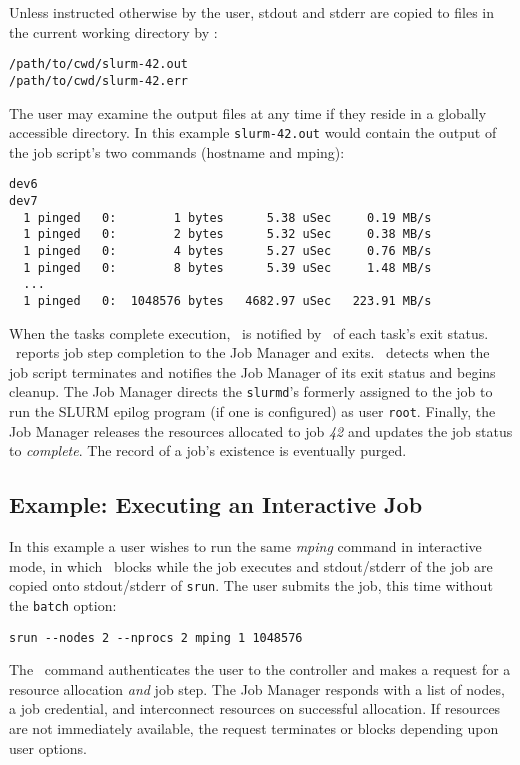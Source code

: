 Unless instructed otherwise by the user, stdout and stderr are
copied to files in the current working directory by \srun :

\begin{verbatim}
/path/to/cwd/slurm-42.out
/path/to/cwd/slurm-42.err
\end{verbatim}

The user may examine the output files at any time if they reside 
in a globally accessible directory. In this example
{\tt slurm-42.out} would  contain the output of the job script's two 
commands (hostname and mping):

\begin{verbatim}
dev6
dev7
  1 pinged   0:        1 bytes      5.38 uSec     0.19 MB/s                     
  1 pinged   0:        2 bytes      5.32 uSec     0.38 MB/s                     
  1 pinged   0:        4 bytes      5.27 uSec     0.76 MB/s                     
  1 pinged   0:        8 bytes      5.39 uSec     1.48 MB/s                     
  ...
  1 pinged   0:  1048576 bytes   4682.97 uSec   223.91 MB/s              
\end{verbatim}

When the tasks complete execution, \srun\ is notified by \slurmd\ of each
task's exit status. \srun\ reports job step completion to the Job Manager
and exits. 
\slurmd\ detects when the job script terminates and notifies
the Job Manager of its exit status and begins cleanup. 
The Job Manager directs the {\tt slurmd}'s formerly assigned to the
job to run the SLURM epilog program (if one is configured) as user 
{\tt root}. 
Finally, the Job Manager releases the resources allocated to job {\em 42}
and updates the job status to {\em complete}. The record of a job's
existence is eventually purged.

\subsection{Example:  Executing an Interactive Job}

In this example a user wishes to run the same {\em mping} command 
in interactive mode, in which \srun\ blocks while the job executes 
and stdout/stderr of the job are copied onto stdout/stderr of {\tt srun}.
The user submits the job, this time without the {\tt batch} option:
\begin{verbatim}
srun --nodes 2 --nprocs 2 mping 1 1048576
\end{verbatim}

The \srun\ command authenticates the user to the controller and
makes a request for a resource allocation {\em and} job step. The Job Manager
responds with a list of nodes, a job credential, and interconnect
resources on successful allocation. If resources are not immediately
available, the request terminates or blocks depending upon user
options.

